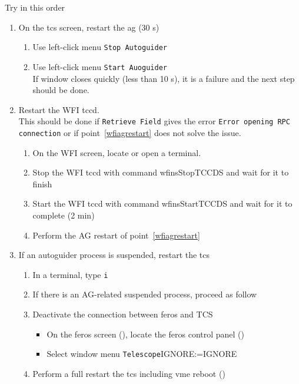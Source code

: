 \documentclass[11pt,fleqn,a4paper]{book}
\makeatletter
\def\menu#1#2{\texttt{#1}\ifx{}#2\else\@for\@x:=#2\do{$\rightarrow$\texttt{\@x}}\fi}
\def\wmenu#1#2{window menu \menu{#1}{#2}}
\makeatother
\begin{document}
\label{proc:fixwfiag}
Try in this order
\begin{enumerate}
  \item\label{wfiagrestart}
       On the \acrlong{tcs} screen, restart the \acrlong{ag} (30 s)
    \begin{enumerate}
       \item Use left-click menu \texttt{Stop Autoguider}
       \item Use left-click menu \texttt{Start Auoguider}\\
             If window closes quickly (less than 10 s), it is a failure and
             the next step should be done.
    \end{enumerate}
  \item Restart the WFI \acrlong{tccd}.\\
        This should be done if \texttt{Retrieve Field} gives the error \texttt{Error opening RPC connection} or if point~\ref{wfiagrestart} does not solve the issue.
    \begin{enumerate}
       \item On the WFI screen, locate or open a terminal.
       \item Stop the WFI \acrlong{tccd} with command
             \gls{wfinsStopTCCDS} and wait for it to finish
       \item Start the WFI \acrlong{tccd} with command \gls{wfinsStartTCCDS} and wait for it to complete (2 min)
       \item Perform the AG restart of point~\ref{wfiagrestart}
    \end{enumerate}
  \item If an autoguider process is suspended, restart the \gls{tcs}
    \begin{enumerate}
       \item In a terminal, type \texttt{i}
       \item If there is an AG-related suspended process, proceed as follow
       \item Deactivate the connection between \gls{feros} and TCS
           \begin{itemize}
                \item On the \gls{feros} screen (), locate the \gls{feros} control panel ()
                \item Select \wmenu{Telescope}{IGNORE}
           \end{itemize}
       \item Perform a full restart the \gls{tcs} including \gls{vme} reboot ()

\end{enumerate}
\end{enumerate}
\end{document}
